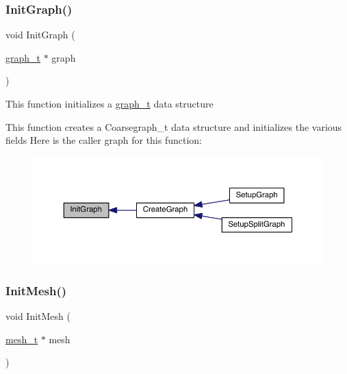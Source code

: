 \subsubsection{\texorpdfstring{Init\+Graph()}{InitGraph()}}
{\footnotesize\ttfamily void Init\+Graph (\begin{DoxyParamCaption}\item[{\hyperlink{a00734}{graph\+\_\+t} $\ast$}]{graph }\end{DoxyParamCaption})}

This function initializes a \hyperlink{a00734}{graph\+\_\+t} data structure

This function creates a Coarsegraph\+\_\+t data structure and initializes the various fields Here is the caller graph for this function\+:\nopagebreak
\begin{figure}[H]
\begin{center}
\leavevmode
\includegraphics[width=350pt]{a00951_a69b67f828387abb4ad1f33eed8f72d13_icgraph}
\end{center}
\end{figure}
\mbox{\label{a00951_a82cd62ea70eaae4395fee538d40cf12b}} 
\subsubsection{\texorpdfstring{Init\+Mesh()}{InitMesh()}}
{\footnotesize\ttfamily void Init\+Mesh (\begin{DoxyParamCaption}\item[{\hyperlink{a00738}{mesh\+\_\+t} $\ast$}]{mesh }\end{DoxyParamCaption})}

